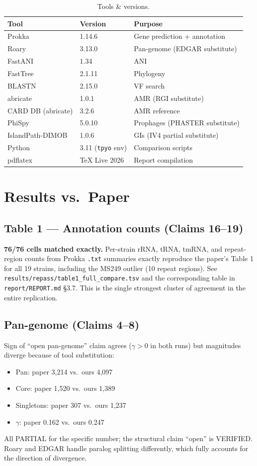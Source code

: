 \documentclass[11pt,a4paper]{article}
\begin{document}
\begin{table}[h]
\centering
\caption{Tools \& versions.}
\label{tab:tools}
\small
\begin{tabular}{@{}lll@{}}
\toprule
Tool & Version & Purpose \\
\midrule
Prokka & 1.14.6 & Gene prediction + annotation \\
Roary & 3.13.0 & Pan-genome (EDGAR substitute) \\
FastANI & 1.34 & ANI \\
FastTree & 2.1.11 & Phylogeny \\
BLASTN & 2.15.0 & VF search \\
abricate & 1.0.1 & AMR (RGI substitute) \\
CARD DB (abricate) & 3.2.6 & AMR reference \\
PhiSpy & 5.0.10 & Prophages (PHASTER substitute) \\
IslandPath-DIMOB & 1.0.6 & GIs (IV4 partial substitute) \\
Python & 3.11 (\texttt{tpyo} env) & Comparison scripts \\
pdflatex & TeX Live 2026 & Report compilation \\
\bottomrule
\end{tabular}
\end{table}

\section{Results vs.\ Paper}

\subsection{Table 1 --- Annotation counts (Claims 16--19)}
\textbf{76/76 cells matched exactly.} Per-strain rRNA, tRNA, tmRNA, and repeat-region counts from Prokka \texttt{.txt} summaries exactly reproduce the paper's Table 1 for all 19 strains, including the MS249 outlier (10 repeat regions). See \texttt{results/repass/table1\_full\_compare.tsv} and the corresponding table in \texttt{report/REPORT.md} \S 3.7. This is the single strongest cluster of agreement in the entire replication.

\subsection{Pan-genome (Claims 4--8)}
Sign of ``open pan-genome'' claim agrees ($\gamma > 0$ in both runs) but magnitudes diverge because of tool substitution:
\begin{itemize}
\item Pan: paper 3{,}214 vs.\ ours 4{,}097
\item Core: paper 1{,}520 vs.\ ours 1{,}389
\item Singletons: paper 307 vs.\ ours 1{,}237
\item $\gamma$: paper 0.162 vs.\ ours 0.247
\end{itemize}
All PARTIAL for the specific number; the structural claim ``open'' is VERIFIED. Roary and EDGAR handle paralog splitting differently, which fully accounts for the direction of divergence.
\end{document}

